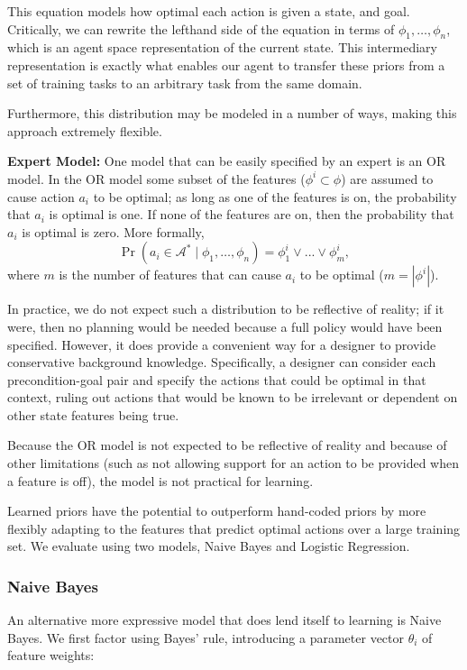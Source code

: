 \documentclass[11pt]{article}
\begin{document}
This equation models how optimal each action is given a state, and goal. Critically, we can rewrite the lefthand side of the equation in terms of $\phi_1, \ldots, \phi_n$, which is an agent space representation of the current state. This intermediary representation is exactly what enables our agent to transfer these priors from a set of training tasks to an arbitrary task from the same domain.

Furthermore, this distribution may be modeled in a number of ways, making this approach extremely flexible.

{\bf Expert Model:} One model that can be easily specified by
an expert is an OR model.
In the OR model some subset of the features 
($\phi^i \subset \phi$) are
assumed to cause action $a_i$ to be optimal; as long as one of
the features is on, the probability that $a_i$ is optimal is one.
If none of the features are on, then the probability that $a_i$ is 
optimal is zero. More formally,
\begin{equation}
\Pr(a_i \in \mathcal{A}^*  \mid \phi_1, \ldots, \phi_n) = \phi_1^i \lor ... \lor \phi_m^i,
\end{equation}
where $m$ is the number of features that can cause $a_i$ to be optimal ($m = |\phi^i|$).

In practice, we do not expect such a distribution to be reflective of
reality; if it were, then no planning would be needed because a full
policy would have been specified. However, it does provide a
convenient way for a designer to provide conservative background
knowledge. Specifically, a designer can consider each precondition-goal
pair and specify the actions that could be optimal in that context, ruling
out actions that would be known to be irrelevant or dependent on other
state features being true.

Because the OR model is not expected to be reflective of
reality and because of other limitations (such as not allowing support
for an action to be provided when a feature is off), the model is not
practical for learning.

Learned priors have the potential to outperform
hand-coded priors by more flexibly adapting to the
features that predict optimal actions over a large training set.
We evaluate using two models, Naive Bayes and Logistic Regression.

\subsubsection{Naive Bayes}
An alternative more expressive model that does lend itself to learning is
Naive Bayes. We first factor using Bayes' rule, introducing a parameter vector $\theta_i$ of
feature weights:
\end{document}
